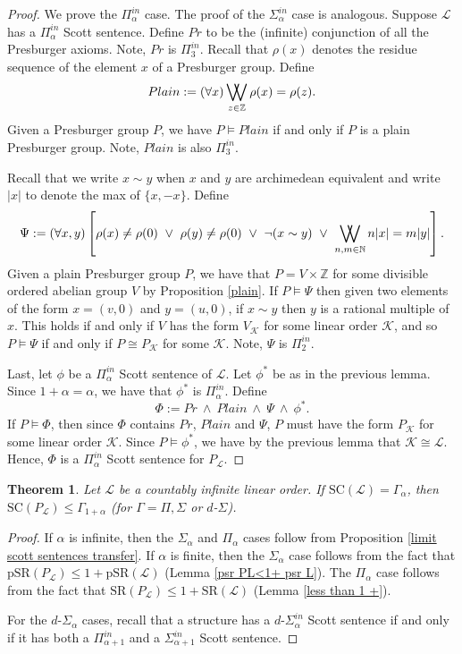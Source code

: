 \documentclass{amsart}%
\newtheorem{theorem}{Theorem}
\numberwithin{theorem}{section}
\newcommand{\Z}{\mathbb{Z}}
\newcommand{\N}{\mathbb{N}}
\newcommand{\0}{\emptyset}
\DeclareMathOperator*{\VV}{\bigvee\mkern-12mu\bigvee}
\newcommand{\LL}{\mathcal{L}}
\newcommand{\SR}{\text{SR}}
\newcommand{\pSR}{\text{pSR}}
\newcommand{\SC}{\text{SC}}
\begin{document}
\begin{proof}
    We prove the $\Pi^{in}_\alpha$ case. The proof of the $\Sigma^{in}_\alpha$ case is analogous. Suppose $\LL$ has a $\Pi^{in}_\alpha$ Scott sentence. Define $Pr$ to be the (infinite) conjunction of all the Presburger axioms. Note, $Pr$ is $\Pi^{in}_3$. Recall that $\rho(x)$ denotes the residue sequence of the element $x$ of a Presburger group. Define $$Plain:= (\forall x) \VV_{z\in \Z} \rho(x)=\rho(z) . $$ Given a Presburger group $P$, we have $P\models Plain$ if and only if $P$ is a plain Presburger group. Note, $Plain$ is also $\Pi^{in}_3$. 
    
    Recall that we write $x\sim y $ when $x$ and $y$ are archimedean equivalent and write $|x|$ to denote the max of $\{x,-x\}$. Define $$\Psi:= (\forall x,y)\left[\rho(x)\neq \rho(0)~ \vee~ \rho(y)\neq \rho(0) ~\vee ~ \neg(x\sim y) ~\vee ~ \VV_{n,m\in \N} n|x|=m|y|\right]. $$ Given a plain Presburger group $P$, we have that $P=V\times \Z$ for some divisible ordered abelian group $V$ by  Proposition \ref{plain}. If $P\models \Psi$ then given two elements of the form $x=(v,0)$ and $y=(u,0)$, if $x\sim y$ then  $y$ is a rational multiple of $x$. This holds if and only if $V$ has the form $V_{\mathcal{K}}$ for some linear order $\mathcal{K}$, and so $P\models \Psi$ if and only if $P\cong P_\mathcal{K}$ for some $\mathcal{K}$. Note, $\Psi$ is $\Pi^{in}_2$.
    
    Last, let $\phi$ be a $\Pi^{in}_\alpha$ Scott sentence of $\LL$. Let $\phi^*$ be as in the previous lemma. Since $1+\alpha=\alpha$, we have that $\phi^*$ is $\Pi^{in}_\alpha$. Define $$\Phi:= Pr ~\wedge ~ Plain~\wedge~\Psi ~\wedge~ \phi^*.$$ If $P\models \Phi$, then since $\Phi$ contains $Pr$, $Plain$ and $\Psi$, $P$ must have the form $P_{\mathcal{K}}$ for some linear order $\mathcal{K}$. Since $P\models \phi^*$, we have by the previous lemma that $\mathcal{K}\cong \LL$. Hence, $\Phi$ is a $\Pi_{\alpha}^{in}$ Scott sentence for $P_\LL$. 
\end{proof}

\begin{theorem}
\label{SCL < SCPL}
    Let $\LL$ be a countably infinite linear order. If $\SC(\LL)= \Gamma_{\alpha}$, then $\SC(P_\LL)\leq \Gamma_{1+\alpha}$ (for $\Gamma = \Pi, \Sigma$ or $d$-$\Sigma$).
\end{theorem}

\begin{proof}
    If $\alpha$ is infinite, then the $\Sigma_\alpha$ and $\Pi_\alpha$ cases follow from Proposition \ref{limit scott sentences transfer}. If $\alpha$ is finite, then the $\Sigma_\alpha$ case follows from the fact that $\pSR(P_\LL) \leq 1 +\pSR(\LL)$ (Lemma \ref{psr PL<1+ psr L}). The $\Pi_{\alpha}$ case follows from the fact that $\SR(P_\LL)\leq 1 +\SR(\LL)$ (Lemma \ref{less than 1 +}).

    For the $d$-$\Sigma_\alpha$ cases, recall that a structure has a $d$-$\Sigma_\alpha^{in}$ Scott sentence if and only if it has both a $\Pi^{in}_{\alpha+1}$ and a $\Sigma^{in}_{\alpha+1}$ Scott sentence. 
\end{proof}
\end{document}
